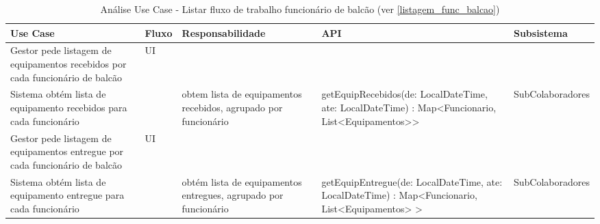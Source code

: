 \documentclass[../relatorio.tex]{subfiles}
\begin{document}
\begin{landscape}
    \begin{table}[!h]
        \centering
        \begin{tabular}{|p{5cm}|p{1cm}|p{4cm}|p{6cm}|p{4cm}|}
            \hline
            \rowcolor{gray!20!white}
            Use Case & Fluxo & Responsabilidade & API & Subsistema \\
            \hline
            \rowcolor{yellow}
            Gestor pede listagem de equipamentos recebidos por cada funcionário de balcão
                     &
            UI
                     &
                     &
                     &
            \\
            \hline
            Sistema obtém lista de equipamento recebidos para cada funcionário
                     &
                     &
            obtem lista de equipamentos recebidos, agrupado por funcionário
                     &
            getEquipRecebidos(de: LocalDateTime, ate: LocalDateTime) : Map<Funcionario, List<Equipamentos>>
                     &
            SubColaboradores
            \\
            \hline
            Gestor pede listagem de equipamentos entregue por cada funcionário de balcão
                     &
            UI
                     &
                     &
                     &
            \\
            \hline
            Sistema obtém lista de equipamento entregue para cada funcionário
                     &
                     &
            obtém lista de equipamentos entregues, agrupado por funcionário
                     &
            getEquipEntregue(de: LocalDateTime, ate: LocalDateTime) : Map<Funcionario, List<Equipamentos> >
                     &
            SubColaboradores
            \\
            \hline
        \end{tabular}
        \caption{Análise Use Case - Listar fluxo de trabalho funcionário de balcão (ver \ref{listagem_func_balcao})}
    \end{table}
\end{landscape}
\end{document}
